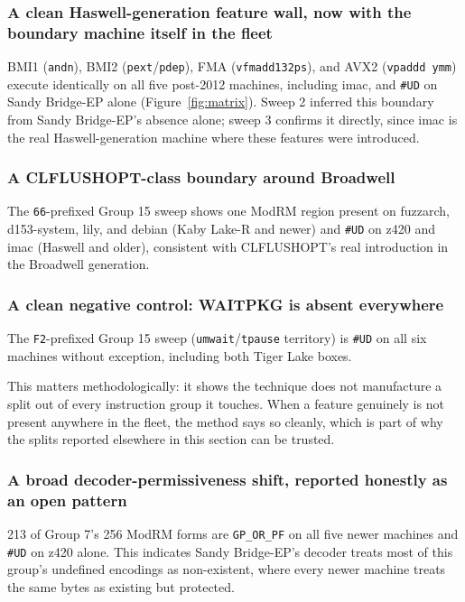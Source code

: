 \documentclass[11pt]{article}
\newcommand{\code}[1]{\texttt{#1}}
\begin{document}
\subsubsection{A clean Haswell-generation feature wall, now with the boundary machine itself in the fleet}

BMI1 (\code{andn}), BMI2 (\code{pext}/\code{pdep}), FMA
(\code{vfmadd132ps}), and AVX2 (\code{vpaddd ymm}) execute identically
on all five post-2012 machines, including imac, and \code{\#UD} on
Sandy Bridge-EP alone (Figure~\ref{fig:matrix}). Sweep 2 inferred this
boundary from Sandy Bridge-EP's absence alone; sweep 3 confirms it
directly, since imac is the real Haswell-generation machine where these
features were introduced.

\subsubsection{A CLFLUSHOPT-class boundary around Broadwell}

The \code{66}-prefixed Group 15 sweep shows one ModRM region present on
fuzzarch, d153-system, lily, and debian (Kaby Lake-R and newer) and
\code{\#UD} on z420 and imac (Haswell and older), consistent with
CLFLUSHOPT's real introduction in the Broadwell generation.

\subsubsection{A clean negative control: WAITPKG is absent everywhere}

The \code{F2}-prefixed Group 15 sweep (\code{umwait}/\code{tpause}
territory) is \code{\#UD} on all six machines without exception,
including both Tiger Lake boxes.

This matters methodologically: it shows the technique does not
manufacture a split out of every instruction group it touches. When a
feature genuinely is not present anywhere in the fleet, the method says
so cleanly, which is part of why the splits reported elsewhere in this
section can be trusted.

\subsubsection{A broad decoder-permissiveness shift, reported honestly as an open pattern}

213 of Group 7's 256 ModRM forms are \code{GP\_OR\_PF} on all five newer
machines and \code{\#UD} on z420 alone. This indicates Sandy Bridge-EP's
decoder treats most of this group's undefined encodings as non-existent,
where every newer machine treats the same bytes as existing but
protected.
\end{document}
